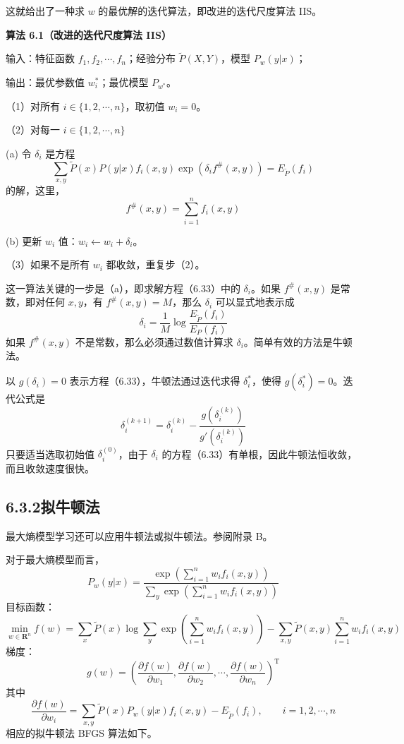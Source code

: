 \documentclass[UTF8,12pt,a4paper,fontset=fandol]{ctexart}
\begin{document}
这就给出了一种求 $w$ 的最优解的迭代算法，即改进的迭代尺度算法 IIS。

\noindent\textbf{算法 6.1（改进的迭代尺度算法 IIS）}\quad

输入：特征函数 $f_1,f_2,\cdots,f_n$；经验分布 $\tilde{P}(X,Y)$，模型 $P_w(y|x)$；

输出：最优参数值 $w_i^*$；最优模型 $P_{w^*}$。

（1）对所有 $i\in\{1,2,\cdots,n\}$，取初值 $w_i=0$。

（2）对每一 $i\in\{1,2,\cdots,n\}$

\quad (a) 令 $\delta_i$ 是方程
\[
\sum_{x,y}\tilde{P}(x)P(y|x)f_i(x,y)\exp(\delta_i f^\#(x,y))=E_{\tilde{P}}(f_i)
\]
的解，这里，
\[
f^\#(x,y)=\sum_{i=1}^n f_i(x,y)
\]

\quad (b) 更新 $w_i$ 值：$w_i\leftarrow w_i+\delta_i$。

（3）如果不是所有 $w_i$ 都收敛，重复步（2）。

这一算法关键的一步是（a），即求解方程（6.33）中的 $\delta_i$。如果 $f^\#(x,y)$ 是常数，即对任何 $x,y$，有 $f^\#(x,y)=M$，那么 $\delta_i$ 可以显式地表示成
\begin{equation}
\delta_i=\frac{1}{M}\log\frac{E_{\tilde{P}}(f_i)}{E_P(f_i)}
\tag{6.34}
\end{equation}
如果 $f^\#(x,y)$ 不是常数，那么必须通过数值计算求 $\delta_i$。简单有效的方法是牛顿法。

以 $g(\delta_i)=0$ 表示方程（6.33），牛顿法通过迭代求得 $\delta_i^*$，使得 $g(\delta_i^*)=0$。迭代公式是
\begin{equation}
\delta_i^{(k+1)}=\delta_i^{(k)}-\frac{g(\delta_i^{(k)})}{g'(\delta_i^{(k)})}
\tag{6.35}
\end{equation}
只要适当选取初始值 $\delta_i^{(0)}$，由于 $\delta_i$ 的方程（6.33）有单根，因此牛顿法恒收敛，而且收敛速度很快。

\subsection*{6.3.2\quad 拟牛顿法}

最大熵模型学习还可以应用牛顿法或拟牛顿法。参阅附录 B。

对于最大熵模型而言，
\[
P_w(y|x)=\frac{\exp\left(\sum_{i=1}^n w_i f_i(x,y)\right)}
{\sum_y\exp\left(\sum_{i=1}^n w_i f_i(x,y)\right)}
\]
目标函数：
\[
\min_{w\in\mathbf{R}^n} f(w)
=\sum_x\tilde{P}(x)\log\sum_y\exp\left(\sum_{i=1}^n w_i f_i(x,y)\right)
-\sum_{x,y}\tilde{P}(x,y)\sum_{i=1}^n w_i f_i(x,y)
\]
梯度：
\[
g(w)=\left(\frac{\partial f(w)}{\partial w_1},\frac{\partial f(w)}{\partial w_2},\cdots,\frac{\partial f(w)}{\partial w_n}\right)^{\mathrm{T}}
\]
其中
\[
\frac{\partial f(w)}{\partial w_i}
=\sum_{x,y}\tilde{P}(x)P_w(y|x)f_i(x,y)-E_{\tilde{P}}(f_i),
\qquad i=1,2,\cdots,n
\]
相应的拟牛顿法 BFGS 算法如下。
\end{document}
